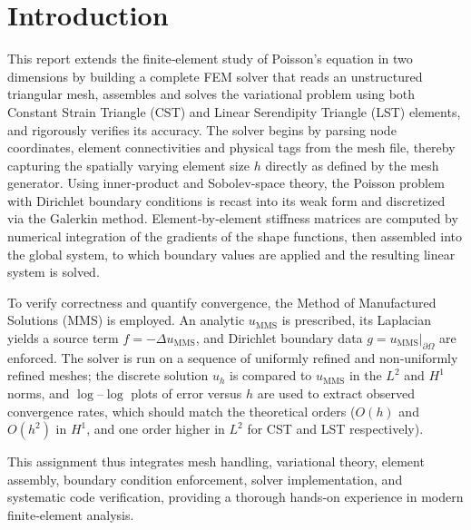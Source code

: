 \section{Introduction}

This report extends the finite‐element study of Poisson’s equation in two dimensions by building a complete FEM solver that reads an unstructured triangular mesh, assembles and solves the variational problem using both Constant Strain Triangle (CST) and Linear Serendipity Triangle (LST) elements, and rigorously verifies its accuracy.  The solver begins by parsing node coordinates, element connectivities and physical tags from the mesh file, thereby capturing the spatially varying element size $h$ directly as defined by the mesh generator.  Using inner‐product and Sobolev‐space theory, the Poisson problem with Dirichlet boundary conditions is recast into its weak form and discretized via the Galerkin method.  Element‐by‐element stiffness matrices are computed by numerical integration of the gradients of the shape functions, then assembled into the global system, to which boundary values are applied and the resulting linear system is solved.

To verify correctness and quantify convergence, the Method of Manufactured Solutions (MMS) is employed.  An analytic $u_{\mathrm{MMS}}$ is prescribed, its Laplacian yields a source term $f=-\Delta u_{\mathrm{MMS}}$, and Dirichlet boundary data $g=u_{\mathrm{MMS}}|_{\partial\Omega}$ are enforced.  The solver is run on a sequence of uniformly refined and non‐uniformly refined meshes; the discrete solution $u_h$ is compared to $u_{\mathrm{MMS}}$ in the $L^2$ and $H^1$ norms, and $\log$–$\log$ plots of error versus $h$ are used to extract observed convergence rates, which should match the theoretical orders ($O(h)$ and $O(h^2)$ in $H^1$, and one order higher in $L^2$ for CST and LST respectively).

This assignment thus integrates mesh handling, variational theory, element assembly, boundary condition enforcement, solver implementation, and systematic code verification, providing a thorough hands‐on experience in modern finite‐element analysis.  
